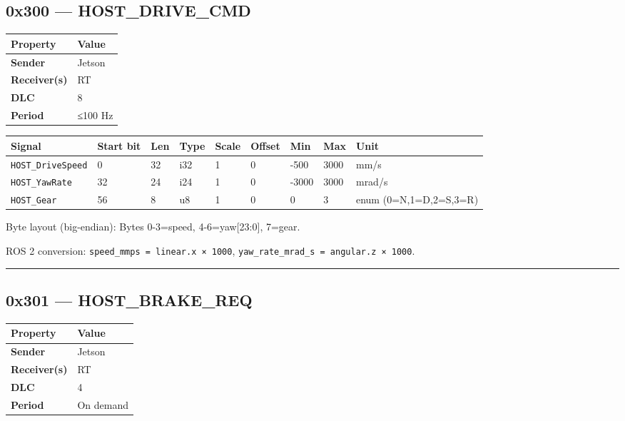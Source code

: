 \subsection{0x300 --- HOST\_DRIVE\_CMD}\label{x300-host_drive_cmd}

\begin{longtable}[]{@{}ll@{}}
\toprule\noalign{}
Property & Value \\
\midrule\noalign{}
\endhead
\bottomrule\noalign{}
\endlastfoot
\textbf{Sender} & Jetson \\
\textbf{Receiver(s)} & RT \\
\textbf{DLC} & 8 \\
\textbf{Period} & ≤100 Hz \\
\end{longtable}

\begin{longtable}[]{@{}lllllllll@{}}
\toprule\noalign{}
Signal & Start bit & Len & Type & Scale & Offset & Min & Max & Unit \\
\midrule\noalign{}
\endhead
\bottomrule\noalign{}
\endlastfoot
\texttt{HOST\_DriveSpeed} & 0 & 32 & i32 & 1 & 0 & -500 & 3000 & mm/s \\
\texttt{HOST\_YawRate} & 32 & 24 & i24 & 1 & 0 & -3000 & 3000 & mrad/s \\
\texttt{HOST\_Gear} & 56 & 8 & u8 & 1 & 0 & 0 & 3 & enum (0=N,1=D,2=S,3=R) \\
\end{longtable}

Byte layout (big-endian): Bytes 0-3=speed, 4-6=yaw{[}23:0{]}, 7=gear.

ROS 2 conversion: \texttt{speed\_mmps\ =\ linear.x\ ×\ 1000},
\texttt{yaw\_rate\_mrad\_s\ =\ angular.z\ ×\ 1000}.

\begin{center}\rule{0.5\linewidth}{0.5pt}\end{center}

\subsection{0x301 --- HOST\_BRAKE\_REQ}\label{x301-host_brake_req}

\begin{longtable}[]{@{}ll@{}}
\toprule\noalign{}
Property & Value \\
\midrule\noalign{}
\endhead
\bottomrule\noalign{}
\endlastfoot
\textbf{Sender} & Jetson \\
\textbf{Receiver(s)} & RT \\
\textbf{DLC} & 4 \\
\textbf{Period} & On demand \\
\end{longtable}

